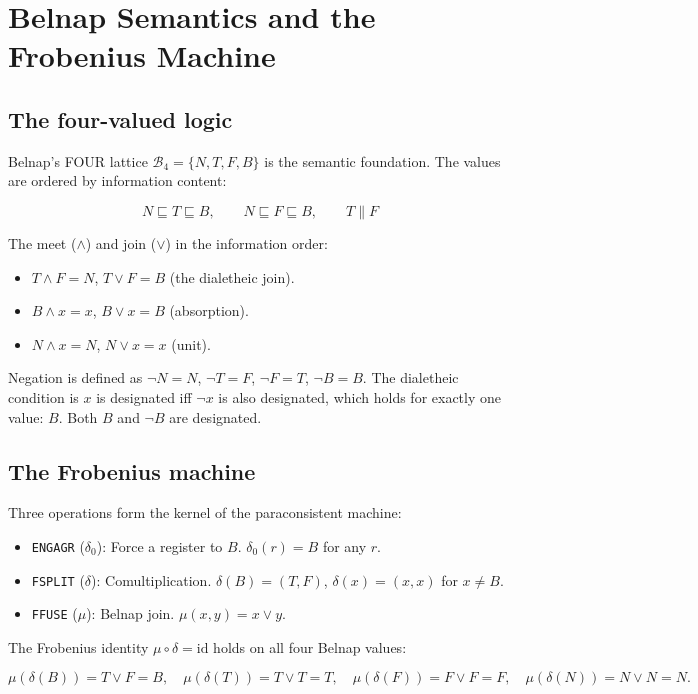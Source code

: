 \documentclass[11pt,a4paper]{article}
\theoremstyle{definition}
\begin{document}
\section{Belnap Semantics and the Frobenius Machine}

\subsection{The four-valued logic}

Belnap's FOUR lattice $\mathcal{B}_4 = \{N, T, F, B\}$ is the semantic
foundation. The values are ordered by information content:

\[
N \sqsubseteq T \sqsubseteq B,\qquad
N \sqsubseteq F \sqsubseteq B,\qquad
T \parallel F
\]

The meet ($\wedge$) and join ($\vee$) in the information order:

\begin{itemize}
  \item $T \wedge F = N$, $T \vee F = B$ (the dialetheic join).
  \item $B \wedge x = x$, $B \vee x = B$ (absorption).
  \item $N \wedge x = N$, $N \vee x = x$ (unit).
\end{itemize}
Negation is defined as $\neg N = N$, $\neg T = F$, $\neg F = T$, $\neg B = B$.
The dialetheic condition is $x$ is designated iff $\neg x$ is also designated,
which holds for exactly one value: $B$. Both $B$ and $\neg B$ are designated.

\subsection{The Frobenius machine}

Three operations form the kernel of the paraconsistent machine:

\begin{itemize}
  \item {\tt ENGAGR} ($\delta_0$): Force a register to $B$.
        $\delta_0(r) = B$ for any $r$.
  \item {\tt FSPLIT} ($\delta$): Comultiplication.
        $\delta(B) = (T, F)$, $\delta(x) = (x, x)$ for $x \neq B$.
  \item {\tt FFUSE} ($\mu$): Belnap join. $\mu(x, y) = x \vee y$.
\end{itemize}

The Frobenius identity $\mu \circ \delta = \text{id}$ holds on all four
Belnap values:

\[
\mu(\delta(B)) = T \vee F = B,\quad
\mu(\delta(T)) = T \vee T = T,\quad
\mu(\delta(F)) = F \vee F = F,\quad
\mu(\delta(N)) = N \vee N = N.
\]
\end{document}
